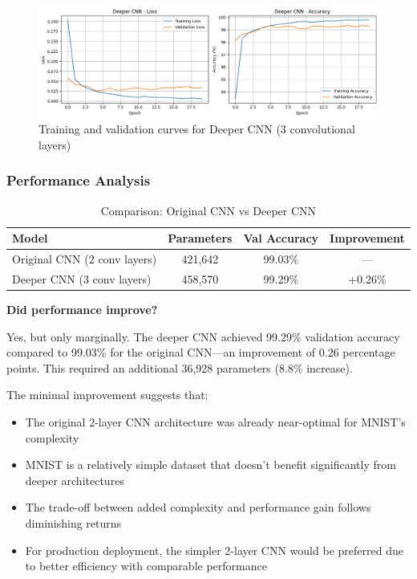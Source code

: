 \begin{figure}[h]
    \centering
    \includegraphics[width=0.8\linewidth]{section4/deeper_cnn.png}
    \caption{Training and validation curves for Deeper CNN (3 convolutional layers)}
    \label{fig:deeper-cnn}
\end{figure}

\subsubsection{Performance Analysis}

\begin{table}[h]
\centering
\begin{tabular}{|l|c|c|c|}
\hline
\textbf{Model} & \textbf{Parameters} & \textbf{Val Accuracy} & \textbf{Improvement} \\ \hline
Original CNN (2 conv layers) & 421,642 & 99.03\% & --- \\ \hline
Deeper CNN (3 conv layers)   & 458,570 & 99.29\% & +0.26\% \\ \hline
\end{tabular}
\caption{Comparison: Original CNN vs Deeper CNN}
\label{tab:deeper-cnn-comparison}
\end{table}

\textbf{Did performance improve?} 

Yes, but only marginally. The deeper CNN achieved 99.29\% validation accuracy compared to 99.03\% for the original CNN---an improvement of 0.26 percentage points. This required an additional 36,928 parameters (8.8\% increase).

The minimal improvement suggests that:
\begin{itemize}
    \item The original 2-layer CNN architecture was already near-optimal for MNIST's complexity
    \item MNIST is a relatively simple dataset that doesn't benefit significantly from deeper architectures
    \item The trade-off between added complexity and performance gain follows diminishing returns
    \item For production deployment, the simpler 2-layer CNN would be preferred due to better efficiency with comparable performance
\end{itemize}

